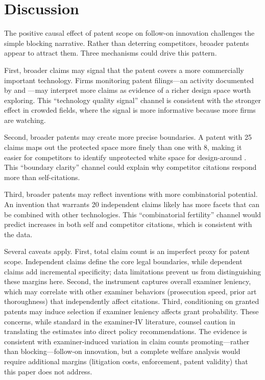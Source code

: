 \documentclass[12pt]{article}
\begin{document}
\section{Discussion}

The positive causal effect of patent scope on follow-on innovation challenges the simple blocking narrative. Rather than deterring competitors, broader patents appear to attract them. Three mechanisms could drive this pattern.

First, broader claims may signal that the patent covers a more commercially important technology. Firms monitoring patent filings---an activity documented by \citet{hall2005} and \citet{moser2005}---may interpret more claims as evidence of a richer design space worth exploring. This ``technology quality signal'' channel is consistent with the stronger effect in crowded fields, where the signal is more informative because more firms are watching.

Second, broader patents may create more precise boundaries. A patent with 25 claims maps out the protected space more finely than one with 8, making it easier for competitors to identify unprotected white space for design-around \citep{merges1990}. This ``boundary clarity'' channel could explain why competitor citations respond more than self-citations.

Third, broader patents may reflect inventions with more combinatorial potential. An invention that warrants 20 independent claims likely has more facets that can be combined with other technologies. This ``combinatorial fertility'' channel would predict increases in both self and competitor citations, which is consistent with the data.

Several caveats apply. First, total claim count is an imperfect proxy for patent scope. Independent claims define the core legal boundaries, while dependent claims add incremental specificity; data limitations prevent us from distinguishing these margins here. Second, the instrument captures overall examiner leniency, which may correlate with other examiner behaviors (prosecution speed, prior art thoroughness) that independently affect citations. Third, conditioning on granted patents may induce selection if examiner leniency affects grant probability. These concerns, while standard in the examiner-IV literature, counsel caution in translating the estimates into direct policy recommendations. The evidence is consistent with examiner-induced variation in claim counts promoting---rather than blocking---follow-on innovation, but a complete welfare analysis would require additional margins (litigation costs, enforcement, patent validity) that this paper does not address.
\end{document}
